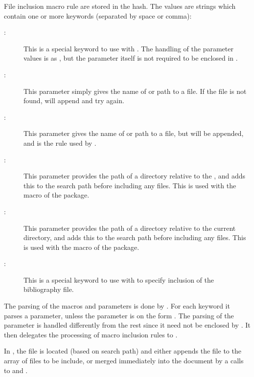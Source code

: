 \documentclass{article}
\begin{document}
File inclusion macro rule are stored in the  hash. The values are strings which contain one or more keywords (separated by space or comma):
%
\begin{description}

\item[:] This is a special keyword to use with . The handling of the parameter values is as , but the parameter itself is not required to be enclosed in \code{\{\}}.

\item[:] This parameter simply gives the name of or path to a file. If the file is not found, \TeXcount{} will append  and try again.

\item[:] This parameter gives the name of or path to a file, but  will be appended, and is the rule used by .

\item[:] This parameter provides the path of a directory relative to the , and adds this to the search path before including any files. This is used with the  macro of the  package.

\item[:] This parameter provides the path of a directory relative to the current directory, and adds this to the search path before including any files. This is used with the  macro of the  package.

\item[:] This is a special keyword to use with  to specify inclusion of the bibliography file.

\end{description}

The parsing of the macros and parameters is done by . For each keyword it parses a parameter, unless the parameter is on the form . The parsing of the  parameter is handled differently from the rest since it need not be enclosed by \code{\{\}}. It then delegates the processing of macro inclusion rules to .

In , the file is located (based on search path) and either appends the file to the  array of files to be include, or merged immediately into the document by a calls to  and .
\end{document}
